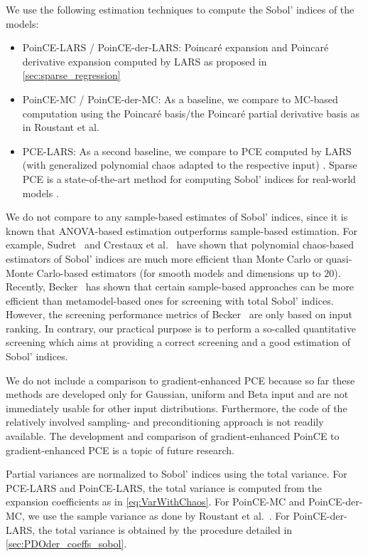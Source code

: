 \documentclass[a4paper,11pt]{article}
\renewcommand{\citep}[2][]{\cite[#1]{#2}}
\renewcommand{\citet}[2][]{\cite[#1]{#2}}
\theoremstyle{definition}
\theoremstyle{remark}
\theoremstyle{theorem}
\begin{document}
We use the following estimation techniques to compute the Sobol' indices of the models:
\begin{itemize}
	\item PoinCE-LARS / PoinCE-der-LARS: Poincar\'e expansion and Poincar\'e derivative expansion computed by LARS as proposed in \cref{sec:sparse_regression}
	\item PoinCE-MC / PoinCE-der-MC: As a baseline, we compare to MC-based computation using the Poincar\'e basis/the Poincar\'e partial derivative basis as in Roustant et al.~\citet{rougam20}
	\item PCE-LARS: As a second baseline, we compare to PCE computed by LARS (with generalized polynomial chaos adapted to the respective input) \citep{blasud11, UQdocPCE}. Sparse PCE is a state-of-the-art method for computing Sobol' indices for real-world models \citep{LeGratiet2017}.
\end{itemize}
We do not compare to any sample-based estimates of Sobol' indices, since it is known that ANOVA-based estimation outperforms sample-based estimation.
For example, Sudret~\citet{sud08} and Crestaux et al.~\citet{cremar08} have shown that polynomial chaos-based estimators of Sobol' indices are much more efficient  than Monte Carlo or quasi-Monte Carlo-based estimators (for smooth models and dimensions up to $20$).
Recently, Becker~\citet{Becker2020} has shown that certain sample-based approaches can be more efficient than metamodel-based ones for screening with total Sobol' indices. However, the screening performance metrics of Becker~\citet{Becker2020} are only based on input ranking. In contrary, our practical purpose is to perform a so-called quantitative screening which aims at providing a correct screening and a good estimation of Sobol' indices.

We do not include a comparison to gradient-enhanced PCE \citep{penham16, Guo2018} because so far these methods are developed only for Gaussian, uniform and Beta input and are not immediately usable for other input distributions. Furthermore, the code of the relatively involved sampling- and preconditioning approach is not readily available. The development and comparison of gradient-enhanced PoinCE to gradient-enhanced PCE is a topic of future research.

Partial variances are normalized to Sobol' indices using the total variance. For PCE-LARS and PoinCE-LARS, the total variance is computed from the expansion coefficients as in \eqref{eq:VarWithChaos}.
For PoinCE-MC and PoinCE-der-MC, we use the sample variance as done by Roustant et al.~\cite{rougam20}.
For PoinCE-der-LARS, the total variance is obtained by the procedure detailed in \cref{sec:PDOder_coeffs_sobol}.
\end{document}
